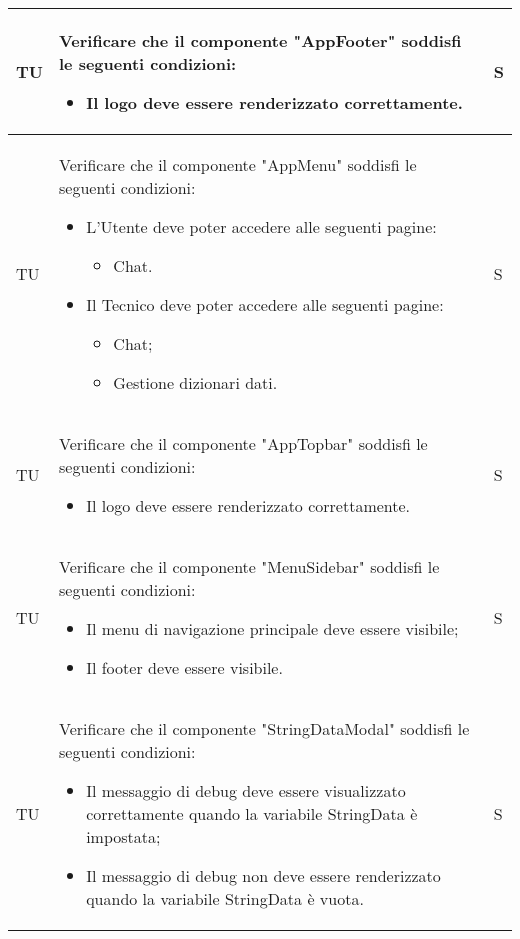 \begin{adjustwidth}{-0.5cm}{-0.5cm}
\begin{longtable}{|P{1.5cm}|>{\raggedright}P{9.5cm}|>{\arraybackslash}P{1.5cm}|}
		TU & Verificare che il componente "AppFooter" soddisfi le seguenti condizioni:
    \begin{itemize}
      \item Il logo deve essere renderizzato correttamente.
    \end{itemize} & S \\
    \hline TU & Verificare che il componente "AppMenu" soddisfi le seguenti condizioni:
    \begin{itemize}
      \item L'Utente deve poter accedere alle seguenti pagine:
      \begin{itemize}
        \item Chat.
      \end{itemize}
      \item Il Tecnico deve poter accedere alle seguenti pagine:
      \begin{itemize}
        \item Chat;
        \item Gestione dizionari dati.
      \end{itemize}
    \end{itemize} & S \\
    \hline TU & Verificare che il componente "AppTopbar" soddisfi le seguenti condizioni:
    \begin{itemize}
      \item Il logo deve essere renderizzato correttamente.
    \end{itemize} & S \\
    \hline TU & Verificare che il componente "MenuSidebar" soddisfi le seguenti condizioni:
    \begin{itemize}
      \item Il menu di navigazione principale deve essere visibile;
      \item Il footer deve essere visibile.
    \end{itemize} & S \\
    \hline TU & Verificare che il componente "StringDataModal" soddisfi le seguenti condizioni:
    \begin{itemize}
      \item Il messaggio di debug deve essere visualizzato correttamente quando la variabile StringData è impostata;
      \item Il messaggio di debug non deve essere renderizzato quando la variabile StringData è vuota.
    \end{itemize} & S \\
	\end{longtable}
\end{adjustwidth}
\egroup